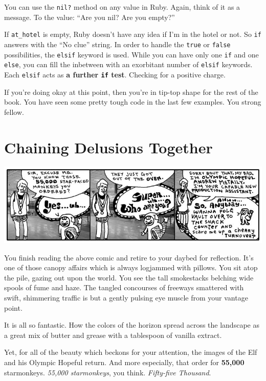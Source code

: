\documentclass[10pt,twoside]{report}
\begin{document}
You can use the \lstinline[breaklines=true]|nil?| method on any value
in Ruby.  Again, think of it as a message. To the value: ``Are you
nil?  Are you empty?''

If \lstinline[breaklines=true]|at_hotel| is empty, Ruby doesn't have
any idea if I'm in the hotel or not.  So
\lstinline[breaklines=true]|if| answers with the ``No clue'' string.
In order to handle the \lstinline[breaklines=true]|true| or
\lstinline[breaklines=true]|false| possibilities, the
\lstinline[breaklines=true]|elsif| keyword is used.  While you can
have only one \lstinline[breaklines=true]|if| and one
\lstinline[breaklines=true]|else|, you can fill the inbetween with an
exorbitant number of \lstinline[breaklines=true]|elsif| keywords.
Each \lstinline[breaklines=true]|elsif| acts as {\bf a further
  \lstinline[breaklines=true]|if| test}.  Checking for a positive
charge.

If you're doing okay at this point, then you're in tip-top shape for
the rest of the book.  You have seen some pretty tough code in the
last few examples.  You strong fellow.


\section{Chaining Delusions Together}


	\includegraphics[width=1.0\textwidth]{cache/29.png}

You finish reading the above comic and retire to your daybed for
reflection. It's one of those canopy affairs which is always logjammed
with pillows.  You sit atop the pile, gazing out upon the world.  You
see the tall smokestacks belching wide spools of fume and haze.  The
tangled concourses of freeways smattered with swift, shimmering
traffic is but a gently pulsing eye muscle from your vantage point.

It is all so fantastic.  How the colors of the horizon spread across
the landscape as a great mix of butter and grease with a tablespoon of
vanilla extract.

Yet, for all of the beauty which beckons for your attention, the
images of the Elf and his Olympic Hopeful return.  And more
especially, that order for {\bf 55,000} starmonkeys.  {\em 55,000
  starmonkeys}, you think.  {\em Fifty-five Thousand}.
\end{document}
